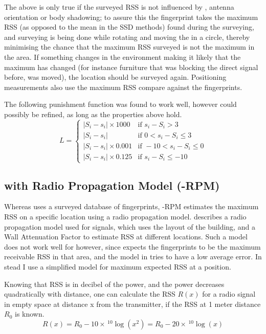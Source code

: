 The above is only true if the surveyed RSS is not influenced by \mpi, antenna orientation or body shadowing; to assure this the fingerprint takes the maximum RSS (as opposed to the mean in the SSD methods) found during the surveying, and surveying is being done while rotating and moving the \device in a circle, thereby minimising the chance that the maximum RSS surveyed is not the maximum in the area.
If something changes in the environment making it likely that the maximum has changed (for instance furniture that was blocking the direct signal before, was moved), the location should be surveyed again.
Positioning measurements also use the maximum RSS compare against the fingerprints.

The following punishment function was found to work well, however could possibly be refined, as long as the properties above hold.
\begin{equation}
    L = \begin{cases}
        |S_i - s_i| \times 1000     & \text{if } s_i - S_i > 3 \\
        |S_i - s_i|                 & \text{if } 0 < s_i -S_i \leq 3 \\
        |S_i - s_i| \times 0.001    & \text{if } -10 < s_i-S_i \leq 0 \\
        |S_i - s_i| \times 0.125    & \text{if } s_i-S_i \leq -10 
    \end{cases}
    \label{eq:architecture-BRP-punishment}
\end{equation}

\subsection{\BRP with Radio Propagation Model (\aBRP-RPM)}
Whereas \aBRP uses a surveyed database of fingerprints, \aBRP-RPM estimates the maximum RSS on a specific location using a radio propagation model.
\citet{bahl2000radar} describes a radio propagation model used for \wifi signals, which uses the layout of the building, and a Wall Attenuation Factor to estimate RSS at different locations.
Such a model does not work well for \aBRP however, since \aBRP expects the fingerprints to be the maximum receivable RSS in that area, and the model in \citet{bahl2000radar} tries to have a low average error.
In stead I use a simplified model for maximum expected RSS at a position.

Knowing that RSS is in decibel of the power, and the power decreases quadratically with distance, one can calculate the RSS $R(x)$ for a radio signal in empty space at distance x from the transmitter, if the RSS at 1 meter distance $R_0$ is known.
\begin{equation}
    R(x) = R_0 - 10 \times \, ^{10}\log(x^2) = R_0 - 20 \times \, ^{10}\log(x)
\end{equation}

